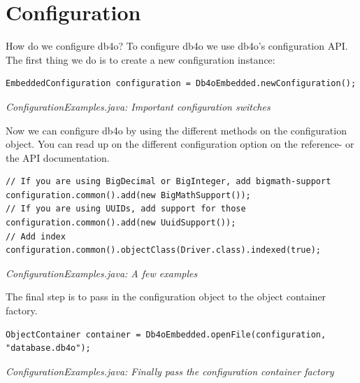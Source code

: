 
\chapter{Configuration}
\label{tut:configuration}

How do we configure db4o? To configure db4o we use db4o's configuration API. The first thing we do is to create a new configuration instance:

\begin{lstlisting}
EmbeddedConfiguration configuration = Db4oEmbedded.newConfiguration();
\end{lstlisting}

{\small\itshape ConfigurationExamples.java: Important configuration switches\par}
\medskip

Now we can configure db4o by using the different methods  on the configuration object. You can read up on the different configuration option on the reference- or the API documentation.

\begin{lstlisting}
// If you are using BigDecimal or BigInteger, add bigmath-support
configuration.common().add(new BigMathSupport());
// If you are using UUIDs, add support for those
configuration.common().add(new UuidSupport());
// Add index
configuration.common().objectClass(Driver.class).indexed(true);
\end{lstlisting}

{\small\itshape ConfigurationExamples.java: A few examples\par}
\medskip

The final step is to pass in the configuration object to the object container factory.

\begin{lstlisting}
ObjectContainer container = Db4oEmbedded.openFile(configuration, "database.db4o");
\end{lstlisting}

{\small\itshape ConfigurationExamples.java: Finally pass the configuration container factory\par}
\medskip

